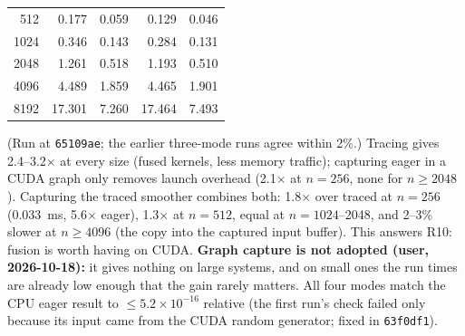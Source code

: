 \documentclass[11pt]{article}
\begin{document}
{\begin{center}
\begin{tabular}{rrrrr}
512 & 0.177 & 0.059 & 0.129 & 0.046 \\
1024 & 0.346 & 0.143 & 0.284 & 0.131 \\
2048 & 1.261 & 0.518 & 1.193 & 0.510 \\
4096 & 4.489 & 1.859 & 4.465 & 1.901 \\
8192 & 17.301 & 7.260 & 17.464 & 7.493 \\
\bottomrule
\end{tabular}
\end{center}
(Run at \texttt{65109ae}; the earlier three-mode runs agree within 2\%.)
Tracing gives 2.4--3.2$\times$ at every size (fused kernels, less memory
traffic); capturing eager in a CUDA graph only removes launch overhead
(2.1$\times$ at $n=256$, none for $n\ge2048$). Capturing the traced smoother
combines both: 1.8$\times$ over traced at $n=256$ (0.033~ms, 5.6$\times$ eager),
1.3$\times$ at $n=512$, equal at $n=1024$--2048, and 2--3\% slower at $n\ge4096$
(the copy into the captured input buffer). This answers R10: fusion is worth
having on CUDA. \textbf{Graph capture is not adopted (user, 2026-10-18):} it
gives nothing on large systems, and on small ones the run times are already low
enough that the gain rarely matters.
All four modes match the CPU eager result to $\le5.2\times10^{-16}$ relative
(the first run's check failed only because its input came from the CUDA random
generator; fixed in \texttt{63f0df1}).}
\end{document}
